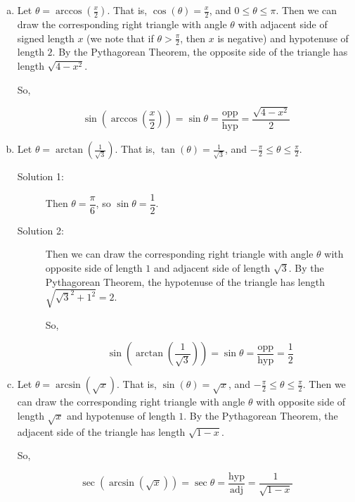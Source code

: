 \begin{solution}
\begin{enumerate}[(a)]
\item Let $\theta = \arccos \left(\frac{x}{2}\right)$. That is, $\cos(\theta) = \frac{x}{2}$, and $0 \leq \theta \leq \pi$. Then we can draw the corresponding right triangle with angle $\theta$ with adjacent side of signed length $x$ (we note that if $\theta > \frac{\pi}{2}$, then $x$ is negative) and hypotenuse of length $2$. By the Pythagorean Theorem, the opposite side of the triangle has length $\sqrt{4-x^2}$.
\begin{center}
\end{center}
So,

\[\sin\left(\arccos \left(\frac{x}{2}\right)\right)=\sin \theta = \frac{\mathrm{opp}}{\mathrm{hyp}} = \frac{\sqrt{4-x^2}}{2}\]


\item Let $\theta = \arctan \left(\frac{1}{\sqrt{3}}\right)$. That is, $\tan(\theta) = \frac{1}{\sqrt{3}}$, and $-\frac{\pi}{2} \leq \theta \leq \frac{\pi}{2}$. 

\begin{description}
\item[Solution 1:] Then $\theta = \dfrac{\pi}{6}$, so $\sin\theta = \dfrac{1}{2}$.
\item[Solution 2:] 
Then we can draw the corresponding right triangle with angle $\theta$ with opposite side of length $1$  and adjacent side of length $\sqrt{3}$. By the Pythagorean Theorem, the hypotenuse of the triangle has length $\sqrt{\sqrt{3}^2+1^2}=2$.
\begin{center}
\end{center}
So,

\[\sin\left(\arctan \left(\frac{1}{\sqrt{3}}\right)\right)=\sin \theta = \frac{\mathrm{opp}}{\mathrm{hyp}} = \frac{1}{2}\]
\end{description}

\item Let $\theta = \arcsin \left(\sqrt{x}\right)$. That is, $\sin(\theta) = \sqrt{x}$, and $-\frac{\pi}{2} \leq \theta \leq \frac{\pi}{2}$. Then we can draw the corresponding right triangle with angle $\theta$ with opposite side of length $\sqrt{x}$ and hypotenuse of length $1$. By the Pythagorean Theorem, the adjacent side of the triangle has length $\sqrt{1-x}$.
\begin{center}
\end{center}
So,

\[\sec\left(\arcsin \left(\sqrt{x}\right)\right)=\sec \theta = \frac{\mathrm{hyp}}{\mathrm{adj}} = \frac{1}{\sqrt{1-x}}\]

\end{enumerate}

\end{solution}



